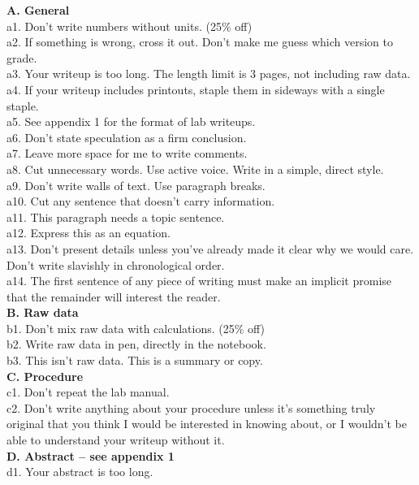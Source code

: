 \thispagestyle{empty}
%
\pagestyle{empty}  
\begin{multicols}{2}[]
\textbf{A. General}\\
a1. Don't write numbers without units. (25\% off)\\
a2. If something is wrong, cross it out. Don't make me guess which version to grade.\\
a3. Your writeup is too long. The length limit is 3 pages, not including raw data.\\
a4. If your writeup includes printouts, staple them in sideways with a single staple.\\
a5. See appendix 1 for the format of lab writeups.\\
a6. Don't state speculation as a firm conclusion.\\
a7. Leave more space for me to write comments.\\
a8. Cut unnecessary words. Use active voice. Write in a simple, direct style.\\
a9. Don't write walls of text. Use paragraph breaks.\\
a10. Cut any sentence that doesn't carry information.\\
a11. This paragraph needs a topic sentence.\\
a12. Express this as an equation.\\
a13. Don't present details unless you've already made it clear why we would care. Don't write slavishly in chronological order.\\
a14. The first sentence of any piece of writing must make an implicit promise that the remainder will interest the reader.\\
\textbf{B. Raw data}\\
b1. Don't mix raw data with calculations. (25\% off)\\
b2.  Write raw data in pen, directly in the notebook.\\
b3. This isn't raw data. This is a summary or copy.\\
\textbf{C. Procedure}\\
c1. Don't repeat the lab manual.\\
c2. Don't write anything about your procedure unless it's something truly original that you think I would be interested in knowing about, or I wouldn't be able to understand your writeup without it.\\
\textbf{D. Abstract -- see appendix 1}\\
d1. Your abstract is too long.\\

\end{multicols}
